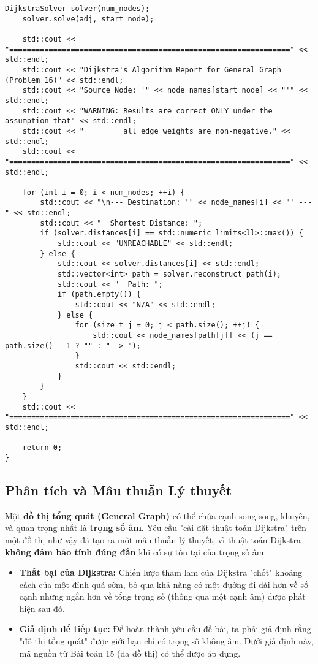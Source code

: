 \documentclass[a4paper,12pt]{article}
\begin{document}
\begin{lstlisting}[style=cppstyle, caption={Xây dựng đồ thị tổng quát trong C++ (chỉ trọng số không âm).}, label={lst:cpp_16}]
    DijkstraSolver solver(num_nodes);
    solver.solve(adj, start_node);

    std::cout << "================================================================" << std::endl;
    std::cout << "Dijkstra's Algorithm Report for General Graph (Problem 16)" << std::endl;
    std::cout << "Source Node: '" << node_names[start_node] << "'" << std::endl;
    std::cout << "WARNING: Results are correct ONLY under the assumption that" << std::endl;
    std::cout << "         all edge weights are non-negative." << std::endl;
    std::cout << "================================================================" << std::endl;

    for (int i = 0; i < num_nodes; ++i) {
        std::cout << "\n--- Destination: '" << node_names[i] << "' ---" << std::endl;
        std::cout << "  Shortest Distance: ";
        if (solver.distances[i] == std::numeric_limits<ll>::max()) {
            std::cout << "UNREACHABLE" << std::endl;
        } else {
            std::cout << solver.distances[i] << std::endl;
            std::vector<int> path = solver.reconstruct_path(i);
            std::cout << "  Path: ";
            if (path.empty()) {
                std::cout << "N/A" << std::endl;
            } else {
                for (size_t j = 0; j < path.size(); ++j) {
                    std::cout << node_names[path[j]] << (j == path.size() - 1 ? "" : " -> ");
                }
                std::cout << std::endl;
            }
        }
    }
    std::cout << "================================================================" << std::endl;
    
    return 0;
}
\end{lstlisting}

\subsection{Phân tích và Mâu thuẫn Lý thuyết}
Một \textbf{đồ thị tổng quát (General Graph)} có thể chứa cạnh song song, khuyên, và quan trọng nhất là \textbf{trọng số âm}. Yêu cầu "cài đặt thuật toán Dijkstra" trên một đồ thị như vậy đã tạo ra một mâu thuẫn lý thuyết, vì thuật toán Dijkstra \textbf{không đảm bảo tính đúng đắn} khi có sự tồn tại của trọng số âm.

\begin{itemize}
    \item \textbf{Thất bại của Dijkstra:} Chiến lược tham lam của Dijkstra "chốt" khoảng cách của một đỉnh quá sớm, bỏ qua khả năng có một đường đi dài hơn về số cạnh nhưng ngắn hơn về tổng trọng số (thông qua một cạnh âm) được phát hiện sau đó.
    \item \textbf{Giả định để tiếp tục:} Để hoàn thành yêu cầu đề bài, ta phải giả định rằng "đồ thị tổng quát" được giới hạn chỉ có trọng số không âm. Dưới giả định này, mã nguồn từ Bài toán 15 (đa đồ thị) có thể được áp dụng.
\end{itemize}
\end{document}
